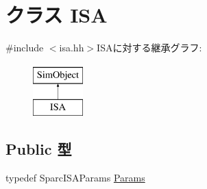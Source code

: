 \hypertarget{classSparcISA_1_1ISA}{
\section{クラス ISA}
\label{classSparcISA_1_1ISA}
}


{\ttfamily \#include $<$isa.hh$>$}ISAに対する継承グラフ:\begin{figure}[H]
\begin{center}
\leavevmode
\includegraphics[height=2cm]{classSparcISA_1_1ISA}
\end{center}
\end{figure}
\subsection*{Public 型}
\begin{DoxyCompactItemize}
\item 
typedef SparcISAParams \hyperlink{classSparcISA_1_1ISA_ac7cac3e1b138ac21b8c4fddb4d68ed25}{Params}
\end{DoxyCompactItemize}
